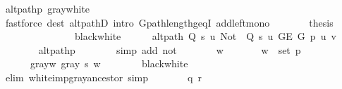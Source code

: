 \begin{isabellebody}
\ alt{\isacharunderscore}{\kern0pt}path{\isacharunderscore}{\kern0pt}p\ gray{\isacharunderscore}{\kern0pt}white\isanewline
\ \ \ \ \ \ \isamarkupfalse%
\ {\isacharparenleft}{\kern0pt}fastforce\ dest{\isacharcolon}{\kern0pt}\ alt{\isacharunderscore}{\kern0pt}pathD{\isacharparenleft}{\kern0pt}{}{\isacharparenright}{\kern0pt}\ intro{\isacharcolon}{\kern0pt}\ G{\isachardot}{\kern0pt}path{\isacharunderscore}{\kern0pt}length{\isacharunderscore}{\kern0pt}geq{\isacharunderscore}{\kern0pt}{}I\ add{\isacharunderscore}{\kern0pt}left{\isacharunderscore}{\kern0pt}mono{\isacharparenright}{\kern0pt}\isanewline
\ \ \ \ \isamarkupfalse%
\ \isamarkupfalse%
\ {\isacharquery}{\kern0pt}thesis\isanewline
\ \ \ \ \ \ \isacommand{{\isachardot}{\kern0pt}}\isamarkupfalse%
\isanewline
\ \ \isamarkupfalse%
\isanewline
\ \ \ \ \isamarkupfalse%
\ black{\isacharunderscore}{\kern0pt}white\isanewline
\ \ \ \ \isamarkupfalse%
\ {\isachardoublequoteopen}alt{\isacharunderscore}{\kern0pt}path\ {\isacharparenleft}{\kern0pt}Q\ s\ u{\isacharparenright}{\kern0pt}\ {\isacharparenleft}{\kern0pt}Not\ {\isasymcirc}\ Q\ s\ u{\isacharparenright}{\kern0pt}\ {\isacharparenleft}{\kern0pt}G{\isachardot}{\kern0pt}E\ G{\isacharparenright}{\kern0pt}\ p\ u\ v{\isachardoublequoteclose}\isanewline
\ \ \ \ \ \ \isamarkupfalse%
\ alt{\isacharunderscore}{\kern0pt}path{\isacharunderscore}{\kern0pt}p\isanewline
\ \ \ \ \ \ \isamarkupfalse%
\ {\isacharparenleft}{\kern0pt}simp\ add{\isacharcolon}{\kern0pt}\ not{\isacharunderscore}{\kern0pt}{\isacharparenleft}{\kern0pt}{}{\isacharparenright}{\kern0pt}{\isacharparenright}{\kern0pt}\isanewline
\ \ \ \ \isamarkupfalse%
\ \isamarkupfalse%
\ w\ \isanewline
\ \ \ \ \ \ {\isachardoublequoteopen}w\ {\isasymin}\ set\ p{\isachardoublequoteclose}\ \isanewline
\ \ \ \ \ \ gray{\isacharunderscore}{\kern0pt}w{\isacharcolon}{\kern0pt}\ {\isachardoublequoteopen}gray\ s\ w{\isachardoublequoteclose}\isanewline
\ \ \ \ \ \ \isamarkupfalse%
\ black{\isacharunderscore}{\kern0pt}white\isanewline
\ \ \ \ \ \ \isamarkupfalse%
\ {\isacharparenleft}{\kern0pt}elim\ white{\isacharunderscore}{\kern0pt}imp{\isacharunderscore}{\kern0pt}gray{\isacharunderscore}{\kern0pt}ancestor{\isacharparenright}{\kern0pt}\ simp{\isacharplus}{\kern0pt}\isanewline
\ \ \ \ \isamarkupfalse%
\ \isamarkupfalse%
\ q\ r\ \isanewline

\end{isabellebody}
